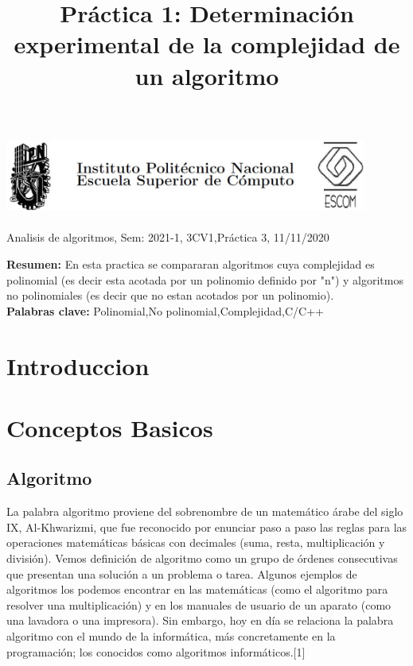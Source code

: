 \documentclass[spanish]{article}
\title {Práctica 1: Determinación experimental de la complejidad de un algoritmo}
\begin{document}
	\centerline{\includegraphics[width=450px,height=100px]{header}}
	\centerline{Analisis de algoritmos, Sem: 2021-1, 3CV1,Práctica  3, 11/11/2020}
	\centerline{}
	\bigskip
	\justify
	\textbf{Resumen:}	
	En esta practica se compararan algoritmos cuya complejidad es polinomial (es decir esta acotada por un polinomio definido por "n") y algoritmos no polinomiales (es decir que no estan acotados por un polinomio).\\
	\textbf{Palabras clave:}
	Polinomial,No polinomial,Complejidad,C/C++
	\section{Introduccion}
	
	\section{Conceptos Basicos}
	\subsection{Algoritmo}
	La palabra algoritmo proviene del sobrenombre de un matemático árabe del siglo IX, Al-Khwarizmi, que fue reconocido por enunciar paso a paso las reglas para las operaciones matemáticas básicas con decimales (suma, resta, multiplicación y división).	
	Vemos definición de algoritmo como un grupo de órdenes consecutivas que presentan una solución a un problema o tarea. Algunos ejemplos de algoritmos los podemos encontrar en las matemáticas (como el algoritmo para resolver una multiplicación) y en los manuales de usuario de un aparato (como una lavadora o una impresora).	
	Sin embargo, hoy en día se relaciona la palabra algoritmo con el mundo de la informática, más concretamente en la programación; los conocidos como algoritmos informáticos.[1]
\end{document}
